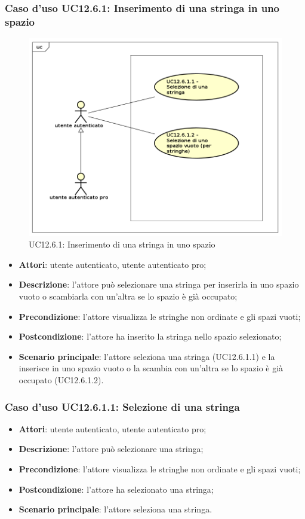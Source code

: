 \newpage
\subsubsection{Caso d'uso UC12.6.1: Inserimento di una stringa in uno spazio}
\label{UC12.6.1}
\begin{figure}[h]
	\centering
	\includegraphics[scale=0.5]{UML/UC12_6_1.png}
	\caption{UC12.6.1: Inserimento di una stringa in uno spazio}
\end{figure}
\begin{itemize}
\item \textbf{Attori}: utente autenticato, utente autenticato pro;
\item \textbf{Descrizione}: l'attore può selezionare una stringa per inserirla in uno spazio vuoto o scambiarla con un'altra se lo spazio è già occupato;
\item \textbf{Precondizione}: l'attore visualizza le stringhe non ordinate e gli spazi vuoti;
\item \textbf{Postcondizione}: l'attore ha inserito la stringa nello spazio selezionato;
\item \textbf{Scenario principale}: l'attore seleziona una stringa (UC12.6.1.1) e la inserisce in uno spazio vuoto o la scambia con un'altra se lo spazio è già occupato (UC12.6.1.2).
\end{itemize}

\subsubsection{Caso d'uso UC12.6.1.1: Selezione di una stringa}
\begin{itemize}
\item \textbf{Attori}: utente autenticato, utente autenticato pro;
\item \textbf{Descrizione}: l'attore può selezionare una stringa;
\item \textbf{Precondizione}: l'attore visualizza le stringhe non ordinate e gli spazi vuoti;
\item \textbf{Postcondizione}: l'attore ha selezionato una stringa;
\item \textbf{Scenario principale}: l'attore seleziona una stringa.
\end{itemize}

